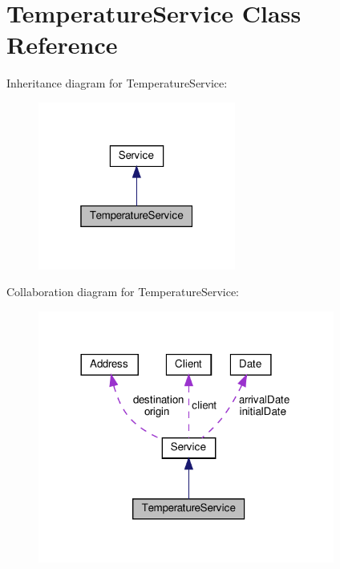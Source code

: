 \hypertarget{class_temperature_service}{}\section{Temperature\+Service Class Reference}
\label{class_temperature_service}


Inheritance diagram for Temperature\+Service\+:\nopagebreak
\begin{figure}[H]
\begin{center}
\leavevmode
\includegraphics[width=184pt]{class_temperature_service__inherit__graph}
\end{center}
\end{figure}


Collaboration diagram for Temperature\+Service\+:
\nopagebreak
\begin{figure}[H]
\begin{center}
\leavevmode
\includegraphics[width=276pt]{class_temperature_service__coll__graph}
\end{center}
\end{figure}
